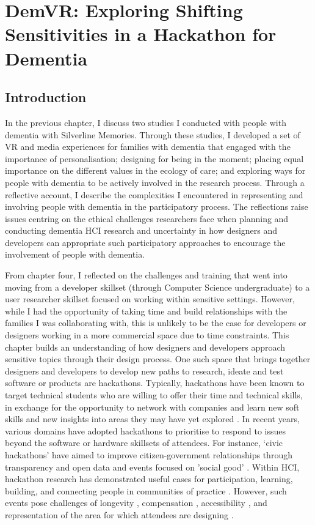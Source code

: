 \chapter{DemVR: Exploring Shifting Sensitivities in a Hackathon for Dementia}
\label{DemVR}

\section{Introduction}
\label{sec:DemVRIntroduction}
In the previous chapter, I discuss two studies I conducted with people with dementia with Silverline Memories. Through these studies, I developed a set of VR and media experiences for families with dementia that engaged with the importance of personalisation; designing for being in the moment; placing equal importance on the different values in the ecology of care; and exploring ways for people with dementia to be actively involved in the research process. Through a reflective account, I describe the complexities I encountered in representing and involving people with dementia in the participatory process. The reflections raise issues centring on the ethical challenges researchers face when planning and conducting dementia HCI research and uncertainty in how designers and developers can appropriate such participatory approaches to encourage the involvement of people with dementia.

From chapter four, I reflected on the challenges and training that went into moving from a developer skillset (through Computer Science undergraduate) to a user researcher skillset focused on working within sensitive settings. However, while I had the opportunity of taking time and build relationships with the families I was collaborating with, this is unlikely to be the case for developers or designers working in a more commercial space due to time constraints. This chapter builds an understanding of how designers and developers approach sensitive topics through their design process. One such space that brings together designers and developers to develop new paths to research, ideate and test software or products are hackathons. Typically, hackathons have been known to target technical students who are willing to offer their time and technical skills, in exchange for the opportunity to network with companies and learn new soft skills and new insights into areas they may have yet explored \citep{olesen_what_2021}. In recent years, various domains have adopted hackathons to prioritise to respond to issues beyond the software or hardware skillsets of attendees. For instance, ‘civic hackathons’ \citep{johnson_civic_2014} have aimed to improve citizen-government relationships through transparency and open data and events focused on 'social good' \citep{ferrario_software_2014}. Within HCI, hackathon research has demonstrated useful cases for participation, learning, building, and connecting people in communities of practice \citep{falk_olesen_10_2020, birbeck_self_2017, hou_hacking_2017, johnson_civic_2014} . However, such events pose challenges of longevity \citep{birbeck_self_2017}, compensation \citep{endrissat_hackathons_2018}, accessibility \citep{hope_hackathons_2019}, and representation of the area for which attendees are designing \citep{toombs_hackerspace_2017}. 


